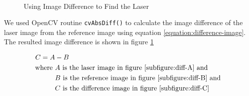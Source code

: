 \begin{figure}[ht!]
\centering
{} \hfill
{} \\
 \hfill
\caption{Using Image Difference to Find the Laser}
\label{figure:difference-image}
\end{figure}

We used OpenCV routine \texttt{cvAbsDiff()} to calculate the image difference
of the laser image from the reference image using equation
\ref{equation:difference-image}. The resulted image difference is shown in
figure \ref{figure:difference-image}

\begin{align}
\label{equation:difference-image}
C = A &- B \\
\text{where}~
&A~ \text{is the laser image in figure \ref{subfigure:diff-A} and} \notag \\
&B~ \text{is the reference image in figure \ref{subfigure:diff-B} and} \notag \\
&C~ \text{is the difference image in figure \ref{subfigure:diff-C}} \notag
\end{align}

